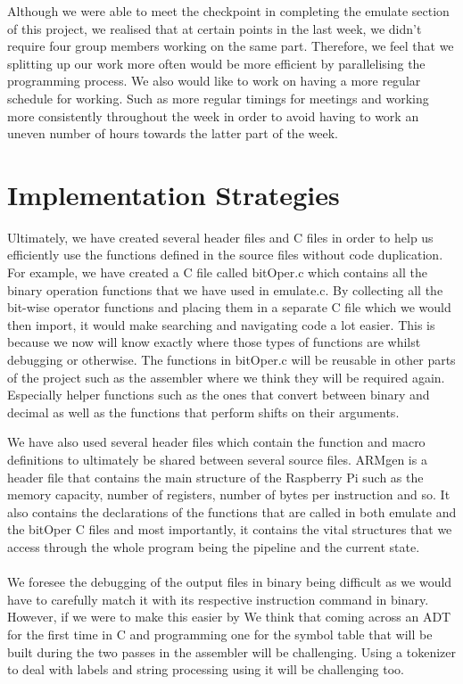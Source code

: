 \documentclass[11pt]{article}
\begin{document}
Although we were able to meet the checkpoint in completing the emulate section of this project, we realised that at certain points in the last week, we didn't require four group members working on the same part. Therefore, we feel that we splitting up our work more often would be more efficient by parallelising the programming process. We also would like to work on having a more regular schedule for working. Such as more regular timings for meetings and working more consistently throughout the week in order to avoid having to work an uneven number of hours towards the latter part of the week.

\section{Implementation Strategies}

Ultimately, we have created several header files and C files in order to help us efficiently use the functions defined in the source files without code duplication. For example, we have created a C file called bitOper.c which contains all the binary operation functions that we have used in emulate.c. By collecting all the bit-wise operator functions and placing them in a separate C file which we would then import, it would make searching and navigating code a lot easier. This is because we now will know exactly where those types of functions are whilst debugging or otherwise. The functions in bitOper.c will be reusable in other parts of the project such as the assembler where we think they will be required again. Especially helper functions such as the ones that convert between binary and decimal as well as the functions that perform shifts on their arguments.

We have also used several header files which contain the function and macro definitions to ultimately be shared between several source files. ARMgen is a header file that contains the main structure of the Raspberry Pi such as the memory capacity, number of registers, number of bytes per instruction and so. It also contains the declarations of the functions that are called in both emulate and the bitOper C files and most importantly, it contains the vital structures that we access through the whole program being the pipeline and the current state.

\paragraph{}
We foresee the debugging of the output files in binary being difficult as we would have to carefully match it with its respective instruction command in binary. However, if we were to make this easier by We think that coming across an ADT for the first time in C and programming one for the symbol table that will be built during the two passes in the assembler will be challenging. Using a tokenizer to deal with labels and string processing using it will be challenging too. 
\end{document}
